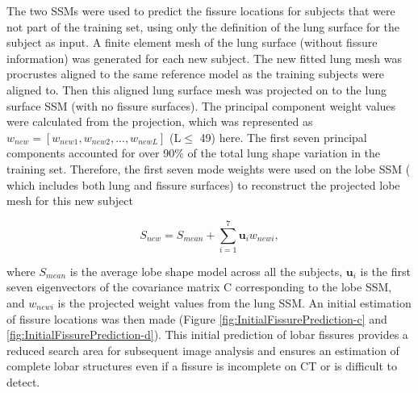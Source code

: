 \documentclass[]{spie}  %
\begin{document}
{The two SSMs were used to predict the fissure locations for subjects that were not part of the training set, using only the definition of the lung surface for the subject as input. A finite element mesh of the lung surface (without fissure information) was generated for each new subject. The new fitted lung mesh was procrustes aligned to the same reference model as the training subjects were aligned to. Then this aligned lung surface mesh was projected on to the lung surface SSM (with no fissure surfaces). The principal component weight values were calculated from the projection, which was represented as $w_{new} = [w_{new1}, w_{new2}, ..., w_{newL}]$ (L$\leq$ 49) here. The first seven principal components accounted for over 90\% of the total lung shape variation in the training set. Therefore, the first seven mode weights were used on the lobe SSM ( which includes both lung and fissure surfaces) to reconstruct the projected lobe mesh for this new subject

\begin{equation}
 \label{eq:FissurePrediction1}
 S_{new} = S_{mean} + \sum_{i=1}^7 \mathbf{u}_i w_{newi},
\end{equation}

\noindent where $S_{mean}$ is the average lobe shape model across all the subjects, $\mathbf{u}_i$ is the first seven eigenvectors of the covariance matrix C corresponding to the lobe SSM, and $w_{newi}$ is the projected weight values from the lung SSM. An initial estimation of fissure locations was then made (Figure \ref{fig:InitialFissurePrediction-c} and \ref{fig:InitialFissurePrediction-d}). This initial prediction of lobar fissures provides a reduced search area for subsequent image analysis and ensures an estimation of complete lobar structures even if a fissure is incomplete on CT or is difficult to detect.

}
\end{document}
